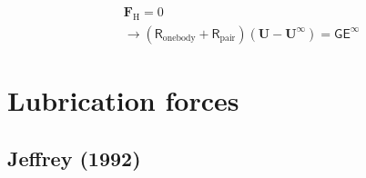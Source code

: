 \documentclass[11pt]{scrartcl}
\newcommand{\tens}[1]{\bm{\mathsf{#1}}}
\begin{document}
\begin{align*}
  &\bm{F}_{\mathrm{H}} = 0 \\
  & \rightarrow
  (\tens{R}_{\mathrm{onebody}} + \tens{R}_{\mathrm{pair}})(\bm{U}-\bm{U}^{\infty})  
  =  \tens{G} \tens{E}^{\infty}  
\end{align*}



\newpage

\section{Lubrication forces}

\subsection*{Jeffrey (1992)}
\end{document}
